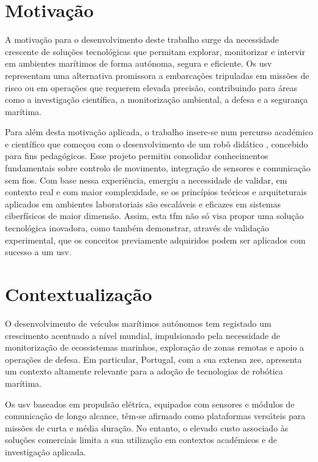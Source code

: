 \section{Motivação}
\label{sec:motivacao}

A motivação para o desenvolvimento deste trabalho surge da necessidade crescente de soluções tecnológicas que permitam explorar, monitorizar e intervir em ambientes marítimos de forma autónoma, segura e eficiente. Os \gls{usv} representam uma alternativa promissora a embarcações tripuladas em missões de risco ou em operações que requerem elevada precisão, contribuindo para áreas como a investigação científica, a monitorização ambiental, a defesa e a segurança marítima.  

Para além desta motivação aplicada, o trabalho insere-se num percurso académico e científico que começou com o desenvolvimento de um robô didático \cite{didactic-robot-thesis}, concebido para fins pedagógicos. Esse projeto permitiu consolidar conhecimentos fundamentais sobre controlo de movimento, integração de sensores e comunicação sem fios. Com base nessa experiência, emergiu a necessidade de validar, em contexto real e com maior complexidade, se os princípios teóricos e arquiteturais aplicados em ambientes laboratoriais são escaláveis e eficazes em sistemas ciberfísicos de maior dimensão. Assim, esta \gls{tfm} não só visa propor uma solução tecnológica inovadora, como também demonstrar, através de validação experimental, que os conceitos previamente adquiridos podem ser aplicados com sucesso a um \gls{usv}.  

\section{Contextualização}
\label{sec:contextualizacao}

O desenvolvimento de veículos marítimos autónomos tem registado um crescimento acentuado a nível mundial, impulsionado pela necessidade de monitorização de ecossistemas marinhos, exploração de zonas remotas e apoio a operações de defesa. Em particular, Portugal, com a sua extensa \gls{zee}, apresenta um contexto altamente relevante para a adoção de tecnologias de robótica marítima.  

Os \gls{usv} baseados em propulsão elétrica, equipados com sensores e módulos de comunicação de longo alcance, têm-se afirmado como plataformas versáteis para missões de curta e média duração. No entanto, o elevado custo associado às soluções comerciais limita a sua utilização em contextos académicos e de investigação aplicada.  

